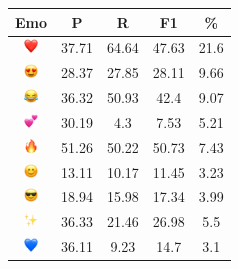 \documentclass{article}
\begin{document}
\begin{table}
\centering
\begin{tabular}{|c|ccc|c|} \hline
\textbf{Emo} & \textbf{P} & \textbf{R} & \textbf{F1} & \textbf{\%} \\ \hline
\includegraphics[height=0.37cm,width=0.37cm]{img/red_heart.png} & 37.71 & 64.64 & 47.63 & 21.6\\ 
\includegraphics[height=0.37cm,width=0.37cm]{img/smiling_face_with_hearteyes.png} & 28.37 & 27.85 & 28.11 & 9.66\\ 
\includegraphics[height=0.37cm,width=0.37cm]{img/face_with_tears_of_joy.png} & 36.32 & 50.93 & 42.4 & 9.07\\ 
\includegraphics[height=0.37cm,width=0.37cm]{img/two_hearts.png} & 30.19 & 4.3 & 7.53 & 5.21\\ 
\includegraphics[height=0.37cm,width=0.37cm]{img/fire.png} & 51.26 & 50.22 & 50.73 & 7.43\\ 
\includegraphics[height=0.37cm,width=0.37cm]{img/smiling_face_with_smiling_eyes.png} & 13.11 & 10.17 & 11.45 & 3.23\\ 
\includegraphics[height=0.37cm,width=0.37cm]{img/smiling_face_with_sunglasses.png} & 18.94 & 15.98 & 17.34 & 3.99\\ 
\includegraphics[height=0.37cm,width=0.37cm]{img/sparkles.png} & 36.33 & 21.46 & 26.98 & 5.5\\ 
\includegraphics[height=0.37cm,width=0.37cm]{img/blue_heart.png} & 36.11 & 9.23 & 14.7 & 3.1\\ 

\end{tabular}
\end{table}
\end{document}
